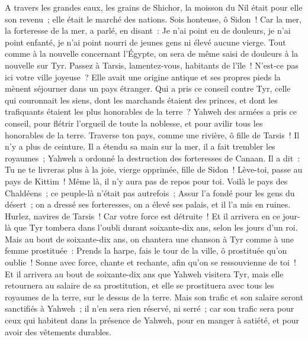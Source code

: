 \begin{multicols}{2}
A travers les grandes eaux, les grains de Shichor, la moisson du Nil était pour elle son revenu~; elle était le marché des nations.
Sois honteuse, ô Sidon~! Car la mer, la forteresse de la mer, a parlé, en disant~: Je n'ai point eu de douleurs, je n'ai point enfanté, je n'ai point nourri de jeunes gens ni élevé aucune vierge.
Tout comme à la nouvelle concernant l’Égypte, on sera de même saisi de douleurs à la nouvelle sur Tyr.
Passez à Tarsis, lamentez-vous, habitants de l'île~!
N'est-ce pas ici votre ville joyeuse~? Elle avait une origine antique et ses propres pieds la mènent séjourner dans un pays étranger.
Qui a pris ce conseil contre Tyr, celle qui couronnait les siens, dont les marchands étaient des princes, et dont les trafiquants étaient les plus honorables de la terre~?
Yahweh des armées a pris ce conseil, pour flétrir l'orgueil de toute la noblesse, et pour avilir tous les honorables de la terre.
Traverse ton pays, comme une rivière, ô fille de Tarsis~! Il n'y a plus de ceinture.
Il a étendu sa main sur la mer, il a fait trembler les royaumes~; Yahweh a ordonné la destruction des forteresses de Canaan.
Il a dit~: Tu ne te livreras plus à la joie, vierge opprimée, fille de Sidon~! Lève-toi, passe au pays de Kittim~! Même là, il n'y aura pas de repos pour toi.
Voilà le pays des Chaldéens~; ce peuple-là n'était pas autrefois~; Assur l'a fondé pour les gens du désert~; on a dressé ses forteresses, on a élevé ses palais, et il l'a mis en ruines.
Hurlez, navires de Tarsis~! Car votre force est détruite~!
Et il arrivera en ce jour-là que Tyr tombera dans l'oubli durant soixante-dix ans, selon les jours d'un roi. Mais au bout de soixante-dix ans, on chantera une chanson à Tyr comme à une femme prostituée~:
Prends la harpe, fais le tour de la ville, ô prostituée qu'on oublie~! Sonne avec force, chante et rechante, afin qu'on se ressouvienne de toi~!
Et il arrivera au bout de soixante-dix ans que Yahweh visitera Tyr, mais elle retournera au salaire de sa prostitution, et elle se prostituera avec tous les royaumes de la terre, sur le dessus de la terre.
Mais son trafic et son salaire seront sanctifiés à Yahweh~; il n'en sera rien réservé, ni serré~; car son trafic sera pour ceux qui habitent dans la présence de Yahweh, pour en manger à satiété, et pour avoir des vêtements durables.

\end{multicols}
